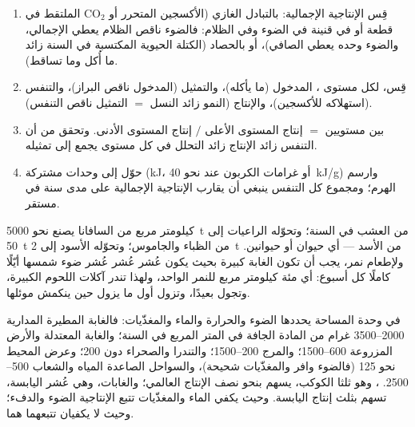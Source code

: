 \begin{method}\label{met:b1:ecosystem-organization:budget}
\begin{enumerate}
  \item قِس الإنتاجية الإجمالية: بالتبادل الغازي (الأكسجين المتحرر
        أو $\mathrm{CO_2}$ الملتقط في قطعة أو في قنينة في الضوء وفي
        الظلام: فالضوء ناقص الظلام يعطي الإجمالي، والضوء وحده يعطي
        الصافي)، أو بالحصاد (الكتلة الحيوية المكتسبة في السنة زائد
        ما أُكل وما تساقط).
  \item قِس، لكل مستوى ، المدخول (ما يأكله)، والتمثيل
        (المدخول ناقص البراز)، والتنفس (استهلاكه للأكسجين)، والإنتاج
        (النمو زائد النسل $=$ التمثيل ناقص التنفس).
  \item {} بين مستويين $=$ إنتاج المستوى الأعلى
        $/$ إنتاج المستوى الأدنى. وتحقق من أن التنفس زائد
        الإنتاج زائد التحلل في كل مستوى يجمع إلى تمثيله.
  \item حوّل إلى وحدات مشتركة (\unit{kJ}، أو غرامات الكربون عند
        نحو \qty{40}{kJ/g}) وارسم الهرم؛ ومجموع كل التنفس ينبغي أن
        يقارب الإنتاجية الإجمالية على مدى سنة في  مستقر.
\end{enumerate}
\end{method}

\begin{example}\label{ex:b1:ecosystem-organization:top}
كيلومتر مربع من السافانا يصنع نحو \qty{5000}{t} من العشب في
السنة؛ وتحوّله الراعيات إلى \qty{50}{t} من الظباء والجاموس؛
وتحوّله الأسود إلى \qty{2}{t} من الأسد --- أي حيوان أو حيوانين.
ولإطعام نمر، يجب أن تكون الغابة كبيرة بحيث يكون عُشر عُشر عُشر
ضوء شمسها أيّلًا كاملًا كل أسبوع: أي مئة كيلومتر مربع للنمر
الواحد، ولهذا تندر آكلات اللحوم الكبيرة، وتجول بعيدًا، وتزول أول
ما يزول حين ينكمش موئلها.
\end{example}

\begin{proposition}\label{prop:b1:ecosystem-organization:biomes}
 في وحدة المساحة يحددها الضوء والحرارة
والماء والمغذّيات: فالغابة المطيرة المدارية \qtyrange{2000}{3500}{}
غرام من المادة الجافة في المتر المربع في السنة؛ والغابة المعتدلة
والأرض المزروعة \qtyrange{600}{1500}{}؛ والمرج \qtyrange{200}{1500}{}؛
والتندرا والصحراء دون \qty{200}{}؛ وعرض المحيط نحو \qty{125}{} (فالضوء
وافر والمغذّيات شحيحة)، والسواحل الصاعدة المياه والشعاب \qtyrange{500}{2500}{}.
، وهو ثلثا الكوكب، يسهم بنحو نصف الإنتاج العالمي؛ والغابات،
وهي عُشر اليابسة، تسهم بثلث إنتاج اليابسة. وحيث يكفي الماء
والمغذّيات تتبع الإنتاجية الضوء والدفء؛ وحيث لا يكفيان تتبعهما هما.
\end{proposition}

